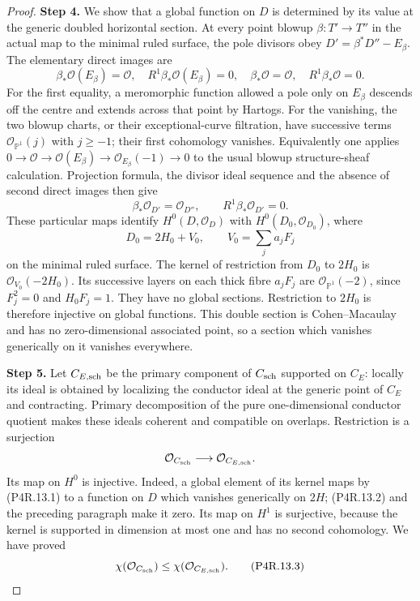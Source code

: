 \begin{proof}
\noindent\textbf{Step 4.} We show that a global function on $D$ is determined by
its value at the generic doubled horizontal section.
At every point blowup $\beta:T'\to T''$ in the actual
map to the minimal ruled surface, the pole divisors obey
$D'=\beta^*D''-E_\beta$. The elementary direct images are
\[
 \beta_*\mathcal O(E_\beta)=\mathcal O,
 \quad R^1\beta_*\mathcal O(E_\beta)=0,
 \quad\beta_*\mathcal O=\mathcal O,
 \quad R^1\beta_*\mathcal O=0.
\]
For the first equality, a meromorphic function allowed
a pole only on $E_\beta$ descends off the centre and
extends across that point by Hartogs. For the vanishing,
the two blowup charts, or their exceptional-curve
filtration, have successive terms
$\mathcal O_{\mathbb P^1}(j)$ with $j\ge-1$;
their first cohomology vanishes. Equivalently one applies
$0\to\mathcal O\to\mathcal O(E_\beta)
\to\mathcal O_{E_\beta}(-1)\to0$ to the usual
blowup structure-sheaf calculation. Projection formula,
the divisor ideal sequence and the absence of second
direct images then give
\[
 \beta_*\mathcal O_{D'}=\mathcal O_{D''},
 \qquad R^1\beta_*\mathcal O_{D'}=0.                         \tag{P4R.13.2}
\]
These particular maps identify $H^0(D,\mathcal O_D)$
with $H^0(D_0,\mathcal O_{D_0})$, where
\[
 D_0=2H_0+V_0,
 \qquad V_0=\sum_j a_jF_j
\]
on the minimal ruled surface. The kernel of restriction
from $D_0$ to $2H_0$ is $\mathcal O_{V_0}(-2H_0)$.
Its successive layers on each thick fibre $a_jF_j$ are
$\mathcal O_{\mathbb P^1}(-2)$, since $F_j^2=0$ and
$H_0F_j=1$. They have no global sections. Restriction
to $2H_0$ is therefore injective on global functions.
This double section is Cohen--Macaulay and has no
zero-dimensional associated point, so a section which
vanishes generically on it vanishes everywhere.

\noindent\textbf{Step 5.} Let $C_{E,\rm sch}$ be the primary component of
$C_{\rm sch}$ supported on $C_E$: locally its ideal
is obtained by localizing the conductor ideal at the
generic point of $C_E$ and contracting. Primary
decomposition of the pure one-dimensional conductor
quotient makes these ideals coherent and compatible
on overlaps. Restriction is a surjection
\[
 \mathcal O_{C_{\rm sch}}\longrightarrow
 \mathcal O_{C_{E,\rm sch}}.
\]
Its map on $H^0$ is injective. Indeed, a global element
of its kernel maps by (P4R.13.1) to a function on $D$
which vanishes generically on $2H$; (P4R.13.2) and the
preceding paragraph make it zero. Its map on $H^1$
is surjective, because the kernel is supported in
dimension at most one and has no second cohomology.
We have proved
\[
 \chi(\mathcal O_{C_{\rm sch}})
 \le\chi(\mathcal O_{C_{E,\rm sch}}).                       \tag{P4R.13.3}
\]


\end{proof}
